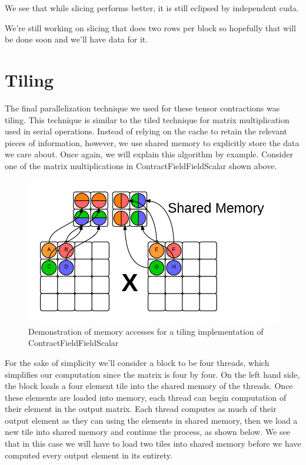 We see that while slicing performs better, it is still eclipsed by independent cuda. 

We're still working on slicing that does two rows per block so hopefully that will be done soon and we'll have data for it. 

\section{Tiling}

The final parallelization technique we used for these tensor contractions was tiling. This technique is similar to the tiled technique for matrix multiplication used in serial operations. Instead of relying on the cache to retain the relevant pieces of information, however, we use shared memory to explicitly store the data we care about. Once again, we will explain this algorithm by example. Consider one of the matrix multiplications in ContractFieldFieldScalar shown above. 

\begin{figure}
    \centering
    \includegraphics[scale = .7]{ContractFieldFieldScalarGraphicTiling}
    \caption{Demonstration of memory accesses for a tiling implementation of ContractFieldFieldScalar}
\end{figure}

For the sake of simplicity we'll consider a block to be four threads, which simplifies our computation since the matrix is four by four. On the left hand side, the block loads a four element tile into the shared memory of the threads. Once these elements are loaded into memory, each thread can begin computation of their element in the output matrix. Each thread computes as much of their output element as they can using the elements in shared memory, then we load a new tile into shared memory and continue the process, as shown below. We see that in this case we will have to load two tiles into shared memory before we have computed every output element in its entirety. 

